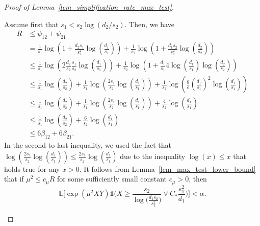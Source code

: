 \documentclass{article}
\newcommand{\EE}{\mathbb{E}}
\newcommand{\one}{\mathds{1}}
\newcommand{\Ct}{C_{*}}
\theoremstyle{remark}
\begin{document}
\begin{proof}[Proof of Lemma~\ref{lem_simplification_rate_max_test}]
\begin{enumerate}
Assume first that  $s_1 < s_2\log(d_2/s_2)$. 
Then, we have 
\begin{align*}
    R &\leq \psi_{12} + \psi_{21}\\
    & = \frac{1}{s_1} \log\left(1+ \frac{d_2s_1}{s_2^2} \log\left(\frac{d_1}{s_1}\right)\right) + \frac{1}{s_2} \log\left(1+ \frac{d_1s_2}{s_1^2} \log\left(\frac{d_2}{s_2}\right)\right)\\
    & \leq \frac{1}{s_1} \log\left(2\frac{d_2}{s_2} \frac{s_1}{s_2} \log\left(\frac{d_1}{s_1}\right)\right) + \frac{1}{s_2} \log\left(1+ \frac{d_1}{s_1} 4\log\left(\frac{d_1}{s_1}\right)\log\left(\frac{d_2}{s_2}\right)\right)\\
    & \leq \frac{1}{s_1} \log\left(  \frac{d_2}{s_2} \right) + \frac{1}{s_1} \log\left(\frac{2s_1}{s_2} \log\left(\frac{d_1}{s_1}\right)\right) + \frac{1}{s_2} \log\left(\frac{8}{e} \left(\frac{d_1}{s_1} \right)^2\log\left(\frac{d_1}{s_1}\right)\right)\\
    & \leq \frac{1}{s_1} \log\left(  \frac{d_2}{s_2} \right) + \frac{1}{s_1} \log\left(\frac{2s_1}{s_2} \log\left(\frac{d_1}{s_1}\right)\right) + \frac{4}{s_2} \log\left(\frac{d_1}{s_1} \right)\\
    & \leq \frac{1}{s_1} \log\left(  \frac{d_2}{s_2} \right) + \frac{6}{s_2} \log\left(\frac{d_1}{s_1} \right)
    \\ &\leq 6 \beta_{12} + 6 \beta_{21}.
\end{align*}
In the second to last inequality, we used the fact that $\log\left(\frac{2s_1}{s_2} \log\left(\frac{d_1}{s_1}\right)\right) \leq \frac{2s_1}{s_2} \log\left(\frac{d_1}{s_1} \right)$ due to the inequality $\log(x) \leq x$ that holds true for any $x>0$. 
It follows from  Lemma~\ref{lem_max_test_lower_bound} that if $\mu^2 \leq c_\mu R$ for some sufficiently small constant $c_\mu>0$, then  
    $$\EE\Big[\exp(\mu^2XY)\one\Big(X \geq \frac{s_2}{\log\big(\frac{d_1s_2}{s_1^2}\big)}\lor  \Ct \frac{s_1^2}{d_1}\Big)\Big] < \alpha.$$ 

    


\end{enumerate}
\end{proof}
\end{document}
